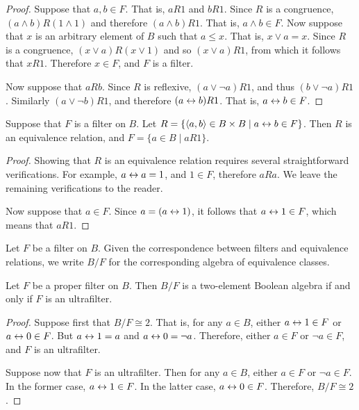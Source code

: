 \begin{proof} Suppose that $a,b\in F$.  That is, $aR1$ and $bR1$.
  Since $R$ is a congruence, $(a\wedge b)R(1\wedge 1)$ and therefore
  $(a\wedge b)R1$.  That is, $a\wedge b\in F$.  Now suppose that $x$
  is an arbitrary element of $B$ such that $a\leq x$.  That is, $x\vee
  a=x$.  Since $R$ is a congruence, $(x\vee a)R(x\vee 1)$ and so
  $(x\vee a)R1$, from which it follows that $xR1$.  Therefore $x\in
  F$, and $F$ is a filter.

  Now suppose that $aRb$.  Since $R$ is reflexive, $(a\vee \neg a)R1$,
  and thus $(b\vee \neg a)R1$.  Similarly $(a\vee \neg b)R1$, and
  therefore $(a\leftrightarrow b)R1$.  That is, $a\leftrightarrow b\in F$.
\end{proof}

\begin{lemma} Suppose that $F$ is a filter on $B$.  Let $R=\{ \langle
  a,b\rangle \in B\times B \mid a\leftrightarrow b\in F\}$.  Then $R$ is an
  equivalence relation, and $F=\{ a\in B\mid aR1\}$.  \end{lemma}

\begin{proof} Showing that $R$ is an equivalence relation requires
  several straightforward verifications.  For example, $a\leftrightarrow a=1$,
  and $1\in F$, therefore $aRa$.  We leave the remaining verifications
  to the reader.

  Now suppose that $a\in F$.  Since $a=(a\leftrightarrow 1)$, it follows that
  $a\leftrightarrow 1\in F$, which means that $aR1$.
\end{proof}


\begin{defn} Let $F$ be a filter on $B$.  Given the
  correspondence between filters and equivalence relations, we write
  $B/F$ for the corresponding algebra of equivalence
  classes. \end{defn}

\begin{prop} Let $F$ be a proper filter on $B$.  Then $B/F$ is a
  two-element Boolean algebra if and only if $F$ is an
  ultrafilter. \end{prop}

\begin{proof} Suppose first that $B/F\cong 2$.  That is, for any $a\in
  B$, either $a\leftrightarrow 1\in F$ or $a\leftrightarrow 0\in F$.  But $a\leftrightarrow 1 =a$ and
  $a\leftrightarrow 0=\neg a$.  Therefore, either $a\in F$ or $\neg a\in F$, and
  $F$ is an ultrafilter.

  Suppose now that $F$ is an ultrafilter.  Then for any $a\in B$,
  either $a\in F$ or $\neg a\in F$.  In the former case, $a\leftrightarrow 1\in
  F$.  In the latter case, $a\leftrightarrow 0\in F$.  Therefore, $B/F\cong 2$.
\end{proof}


